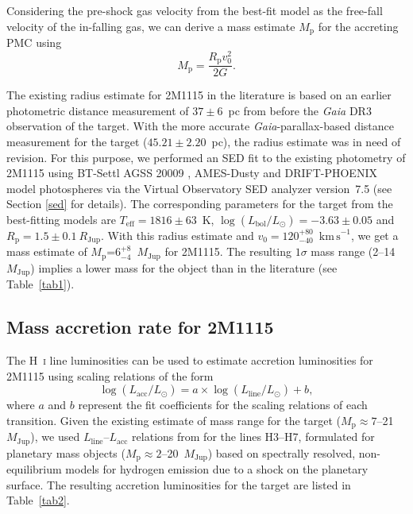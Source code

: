 \documentclass{aa}
\newcommand{\mj}{\ensuremath{M_\mathrm{Jup}}\xspace}
\newcommand{\rj}{\ensuremath{R_\mathrm{Jup}}\xspace}
\newcommand{\lsun}{\ensuremath{L_\odot}\xspace}
\newcommand{\Mp}{\ensuremath{M_{\mathrm{p}}}\xspace}
\newcommand{\Rp}{\ensuremath{R_{\mathrm{p}}}\xspace}
\newcommand{\Teff}{\ensuremath{T_{\mathrm{eff}}}\xspace}
\newcommand{\Lbol}{\ensuremath{L_{\mathrm{bol}}}\xspace}
\newcommand{\Lacc}{\ensuremath{L_{\mathrm{acc}}}\xspace}
\newcommand{\Lline}{\ensuremath{L_{\mathrm{line}}}\xspace}
\newcommand{\kms}{\ensuremath{\mathrm{km\,s}^{-1}}\xspace}
\begin{document}
Considering the pre-shock gas velocity from the best-fit \cite{aoyama2020, aoyama2021} model as the free-fall velocity of the in-falling gas, we can derive a mass estimate \Mp for the accreting PMC \citep{aoyama2019} using 
\begin{equation}
    \Mp = \frac{ \Rp v_0^2}{2G}.
\end{equation}

The existing radius estimate for 2M1115 in the literature \citep[$\Rp=1.3\pm0.2~\rj$; ][]{theissen2018} is based on an earlier photometric distance measurement of $37\pm6$~pc from before the \textit{Gaia} DR3 observation of the target. With the more accurate \textit{Gaia}-parallax-based distance measurement for the target ($45.21\pm2.20$~pc), the radius estimate was in need of revision. For this purpose, we performed an SED fit to the existing photometry of 2M1115 using BT-Settl AGSS 20009 \citep{allard2012, allard2013, asplund2009}, AMES-Dusty \citep{chabrier2000, allard2001} and DRIFT-PHOENIX \citep{phoenix2003, phoenix2008, phoenix2011} model photospheres via the Virtual Observatory SED analyzer \citep[VOSA\footnote{\url{http://svo2.cab.inta-csic.es/theory/vosa/}};][]{bayo2008} version~7.5 (see Section \ref{sed} for details). The corresponding parameters for the target from the best-fitting models are $\Teff=1816\pm63$~K,  $\log(\Lbol/\lsun)=-3.63\pm0.05$ and $\Rp=1.5\pm0.1~\rj$.
With this radius estimate and $v_0=120^{+80}_{-40}$~\kms, we get a mass estimate of \Mp=$6^{+8}_{-4}$~\mj for 2M1115. The resulting $1\sigma$ mass range (2--14~\mj) implies a lower mass for the object than in the literature (see Table~\ref{tab1}). 

\subsection{Mass accretion rate for 2M1115} \label{mar}

The H~\textsc{i} line luminosities can be used to estimate accretion luminosities for 2M1115 using scaling relations of the form
\begin{equation}
\log(\Lacc/L_{\odot}) = a\times \log(\Lline/L_{\odot}) + b, \label{eq1}
\end{equation}
where $a$ and $b$ represent the fit coefficients for the scaling relations of each transition. Given the existing estimate of mass range for the target ($\Mp\approx7$--21~\mj), we used \Lline--\Lacc relations from \cite{aoyama2021} for the lines H3--H7, formulated for planetary mass objects ($\Mp\approx2$--20~\mj) based on spectrally resolved, non-equilibrium models for hydrogen emission due to a shock on the planetary surface. The resulting accretion luminosities for the target are listed in Table~\ref{tab2}.
\end{document}
